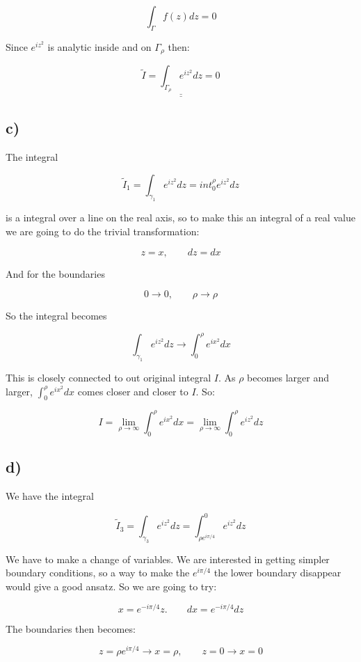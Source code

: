 \documentclass[a4paper,norsk, 10pt]{article}
\begin{document}
$$
\int_{\Gamma} f(z) dz = 0
$$

Since $e^{iz^2}$ is analytic inside and on $\Gamma_{\rho}$ then:

$$
\underline{\underline{\tilde{I} = \int_{\Gamma_{\rho}} e^{iz^2}dz = 0}}
$$

\subsection*{c)}

The integral

$$
\tilde{I}_1 = \int_{\gamma_1} e^{iz^2} dz = int_0^{\rho} e^{iz^2} dz
$$

is a integral over a line on the real axis, so to make this an integral of a real value we are going to do the trivial transformation:

$$
z = x, \qquad dz = dx
$$

And for the boundaries

$$
0 \rightarrow 0, \qquad \rho \rightarrow \rho
$$

So the integral becomes

$$
\int_{\gamma_1} e^{iz^2} dz \rightarrow \int_0^{\rho} e^{ix^2}dx
$$

This is closely connected to out original integral $I$. As $\rho$ becomes larger and larger, $\int_0^{\rho} e^{ix^2}dx$ comes closer and closer to $I$. So:

\begin{equation}
I = \lim_{\rho \rightarrow \infty} \int_0^{\rho} e^{ix^2}dx = \lim_{\rho \rightarrow \infty} \int_0^{\rho} e^{iz^2}dz
\label{eq:I1}
\end{equation}


\subsection*{d)}

We have the integral

$$
\tilde{I}_ 3 = \int_{\gamma_3}e^{iz^2} dz = \int_{\rho e^{i\pi/4}}^0 e^{iz^2} dz 
$$

We have to make a change of variables. We are interested in getting simpler boundary conditions, so a way to make the $e^{i\pi/4}$ the lower boundary disappear would give a good ansatz. So we are going to try:

$$
x = e^{-i\pi/4}z. \qquad dx = e^{-i\pi /4}dz
$$

The boundaries then becomes:

$$
z = \rho e^{i\pi/4} \rightarrow x = \rho, \qquad z = 0 \rightarrow x = 0
$$
\end{document}
